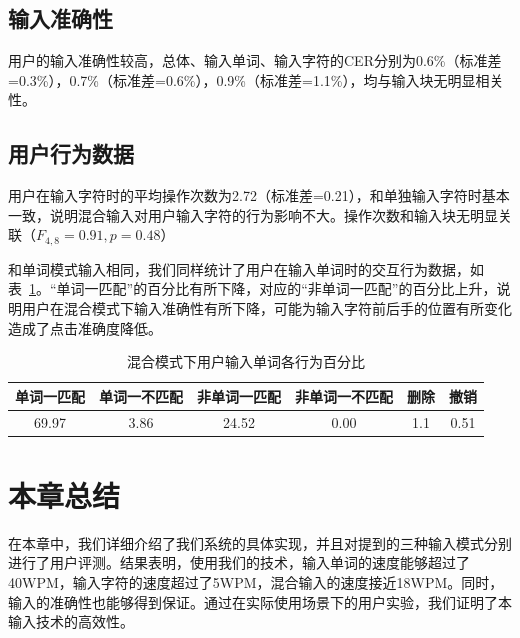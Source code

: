\subsection{输入准确性}
用户的输入准确性较高，总体、输入单词、输入字符的CER分别为0.6\%（标准差=0.3\%），0.7\%（标准差=0.6\%），0.9\%（标准差=1.1\%），均与输入块无明显相关性。

\subsection{用户行为数据}
用户在输入字符时的平均操作次数为2.72（标准差=0.21），和单独输入字符时基本一致，说明混合输入对用户输入字符的行为影响不大。操作次数和输入块无明显关联（$F_{4,8}=0.91, p =0.48$）

和单词模式输入相同，我们同样统计了用户在输入单词时的交互行为数据，如表~\ref{tab:hybrid-stat}。“单词一匹配”的百分比有所下降，对应的“非单词一匹配”的百分比上升，说明用户在混合模式下输入准确性有所下降，可能为输入字符前后手的位置有所变化造成了点击准确度降低。

\begin{table}[h]
  \centering
  \begin{minipage}[t]{0.9\linewidth} %
  \caption[混合模式下用户输入单词各行为百分比]{混合模式下用户输入单词各行为百分比}
  \label{tab:hybrid-stat}
    \centering
    \begin{tabularx}{\linewidth}{cccccc}
      \toprule[1.5pt]
      单词一匹配 & 单词一不匹配 & 非单词一匹配 & 非单词一不匹配 & 删除 & 撤销\\\midrule[1pt]
      69.97 & 3.86 & 24.52 & 0.00 & 1.1 & 0.51\\
      \bottomrule[1.5pt]
    \end{tabularx}
  \end{minipage}
\end{table}

\section{本章总结}
在本章中，我们详细介绍了我们系统的具体实现，并且对提到的三种输入模式分别进行了用户评测。结果表明，使用我们的技术，输入单词的速度能够超过了40WPM，输入字符的速度超过了5WPM，混合输入的速度接近18WPM。同时，输入的准确性也能够得到保证。通过在实际使用场景下的用户实验，我们证明了本输入技术的高效性。
